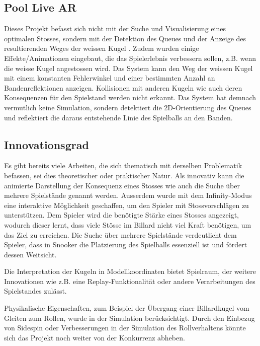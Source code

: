 \subsection{Pool Live AR}
Dieses Projekt befasst sich nicht mit der Suche und Visualisierung eines optimalen Stosses, sondern mit der
Detektion des Queues und der Anzeige des resultierenden Weges der weissen Kugel \cite{poollivear}. Zudem wurden einige
Effekte/Animationen eingebaut, die das Spielerlebnis verbessern sollen, z.B. wenn die weisse Kugel angestossen wird.
Das System kann den Weg der weissen Kugel mit einem konstanten Fehlerwinkel und einer bestimmten Anzahl an
Bandenreflektionen anzeigen.
Kollisionen mit anderen Kugeln wie auch deren Konsequenzen für den Spielstand werden nicht erkannt.
Das System hat demnach vermutlich keine Simulation, sondern detektiert die 2D-Orientierung des Queues und reflektiert die
daraus entstehende Linie des Spielballs an den Banden.

\subsection{Innovationsgrad}
Es gibt bereits viele Arbeiten, die sich thematisch mit derselben Problematik befassen, sei dies theoretischer oder
praktischer Natur.
Als innovativ kann die animierte Darstellung der Konsequenz eines Stosses wie auch die Suche über
mehrere Spielstände genannt werden.
Ausserdem wurde mit dem Infinity-Modus eine interaktive Möglichkeit geschaffen, um den Spieler mit Stossvorschlägen zu unterstützen.
Dem Spieler wird die benötigte Stärke eines Stosses angezeigt, wodurch dieser lernt, dass viele Stösse im Billard nicht viel
Kraft benötigen, um das Ziel zu erreichen.
Die Suche über mehrere Spielstände verdeutlicht dem Spieler, dass in Snooker die Platzierung des Spielballs essenziell ist
und fördert dessen Weitsicht.

Die Interpretation der Kugeln in Modellkoordinaten bietet Spielraum,
der weitere Innovationen wie z.B. eine Replay-Funktionalität oder andere Verarbeitungen des Spielstandes zulässt.

Physikalische Eigenschaften, zum Beispiel der Übergang einer Billardkugel vom Gleiten zum Rollen,
wurde in der Simulation berücksichtigt.
Durch den Einbezug von Sidespin oder Verbesserungen in der Simulation des Rollverhaltens könnte sich das
Projekt noch weiter von der Konkurrenz abheben.
